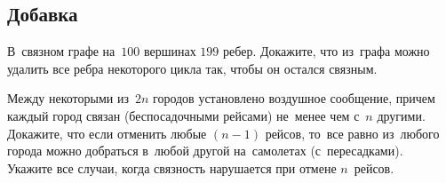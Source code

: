 


\subsection*{Добавка}


\begin{problems}

\item
В~связном графе на~$100$ вершинах $199$ ребер.
Докажите, что из~графа можно удалить все ребра некоторого цикла так, чтобы он
остался связным.

\item
Между некоторыми из~$2 n$ городов установлено воздушное сообщение, причем
каждый город связан (беспосадочными рейсами) не~менее чем с~$n$ другими.
\\
\subproblem
Докажите, что если отменить любые $(n - 1)$ рейсов, то~все равно из~любого
города можно добраться в~любой другой на~самолетах (с~пересадками).
\\
\subproblem
Укажите все случаи, когда связность нарушается при отмене $n$~рейсов.

\end{problems}

